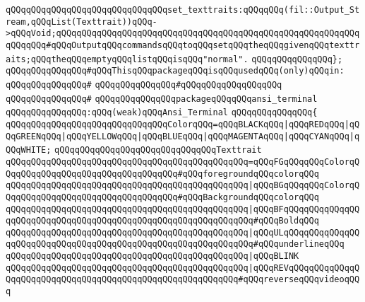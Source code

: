\verb|qQQqqQQqqQQqqQQqqQQqqQQqqQQqqQQqset_texttraits:qQQqqQQq(fil::Output_Stream,qQQqList(Texttrait))qQQq->qQQqVoid;qQQqqQQqqQQqqQQqqQQqqQQqqQQqqQQqqQQqqQQqqQQqqQQqqQQqqQQqqQQqqQQqqQQq#qQQqOutputqQQqcommandsqQQqtoqQQqsetqQQqtheqQQqgivenqQQqtexttraits;qQQqtheqQQqemptyqQQqlistqQQqisqQQq"normal".|\newline
\verb|qQQqqQQqqQQqqQQq};|\newline
\newline
\verb|qQQqqQQqqQQqqQQq#qQQqThisqQQqpackageqQQqisqQQqusedqQQq(only)qQQqin:|\newline
\verb|qQQqqQQqqQQqqQQq#|\newline
\verb|qQQqqQQqqQQqqQQq#qQQqqQQqqQQqqQQqqQQq|\newline
\verb|qQQqqQQqqQQqqQQq#|\newline
\verb|qQQqqQQqqQQqqQQqpackageqQQqqQQqansi_terminal|\newline
\verb|qQQqqQQqqQQqqQQq:qQQq(weak)qQQqAnsi_Terminal|\newline
\verb|qQQqqQQqqQQqqQQq{|\newline
\verb|qQQqqQQqqQQqqQQqqQQqqQQqqQQqqQQqColorqQQq=qQQqBLACKqQQq|\verb#|qQQqREDqQQq|qQQqGREENqQQq|qQQqYELLOWqQQq|qQQqBLUEqQQq|qQQqMAGENTAqQQq|qQQqCYANqQQq|qQQqWHITE;#\newline
\newline
\verb|qQQqqQQqqQQqqQQqqQQqqQQqqQQqqQQqTexttrait|\newline
\verb|qQQqqQQqqQQqqQQqqQQqqQQqqQQqqQQqqQQqqQQqqQQqqQQq=qQQqFGqQQqqQQqColorqQQqqQQqqQQqqQQqqQQqqQQqqQQqqQQqqQQq#qQQqforegroundqQQqcolorqQQq|\newline
\verb|qQQqqQQqqQQqqQQqqQQqqQQqqQQqqQQqqQQqqQQqqQQqqQQq|\verb#|qQQqBGqQQqqQQqColorqQQqqQQqqQQqqQQqqQQqqQQqqQQqqQQqqQQq#\verb|#qQQqBackgroundqQQqcolorqQQq|\newline
\verb|qQQqqQQqqQQqqQQqqQQqqQQqqQQqqQQqqQQqqQQqqQQqqQQq|\verb#|qQQqBFqQQqqQQqqQQqqQQqqQQqqQQqqQQqqQQqqQQqqQQqqQQqqQQqqQQqqQQqqQQqqQQq#\verb|#qQQqBoldqQQq|\newline
\verb|qQQqqQQqqQQqqQQqqQQqqQQqqQQqqQQqqQQqqQQqqQQqqQQq|\verb#|qQQqULqQQqqQQqqQQqqQQqqQQqqQQqqQQqqQQqqQQqqQQqqQQqqQQqqQQqqQQqqQQqqQQq#\verb|#qQQqunderlineqQQq|\newline
\verb|qQQqqQQqqQQqqQQqqQQqqQQqqQQqqQQqqQQqqQQqqQQqqQQq|\verb#|qQQqBLINK#\newline
\verb|qQQqqQQqqQQqqQQqqQQqqQQqqQQqqQQqqQQqqQQqqQQqqQQq|\verb#|qQQqREVqQQqqQQqqQQqqQQqqQQqqQQqqQQqqQQqqQQqqQQqqQQqqQQqqQQqqQQqqQQq#\verb|#qQQqreverseqQQqvideoqQQq|\newline
